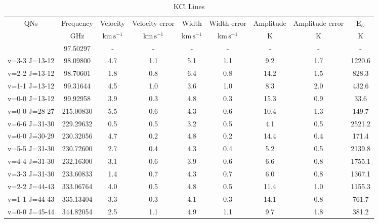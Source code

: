 \begin{table*}[htp]
\centering
\caption{KCl Lines}
\begin{tabular}{ccccccccc}
\label{tab:KCl_salt_lines}
QNs & Frequency & Velocity & Velocity error & Width & Width error & Amplitude & Amplitude error & E$_U$ \\
 & $\mathrm{GHz}$ & $\mathrm{km\,s^{-1}}$ & $\mathrm{km\,s^{-1}}$ & $\mathrm{km\,s^{-1}}$ & $\mathrm{km\,s^{-1}}$ & $\mathrm{K}$ & $\mathrm{K}$ & $\mathrm{K}$ \\
\hline
 & 97.50297 & - & - & - & - & - & - & - \\
v=3-3 J=13-12 & 98.09800 & 4.7 & 1.1 & 5.1 & 1.1 & 9.2 & 1.7 & 1220.6 \\
v=2-2 J=13-12 & 98.70601 & 1.8 & 0.8 & 6.4 & 0.8 & 14.2 & 1.5 & 828.3 \\
v=1-1 J=13-12 & 99.31644 & 4.5 & 1.0 & 3.6 & 1.0 & 8.3 & 2.0 & 432.6 \\
v=0-0 J=13-12 & 99.92958 & 3.9 & 0.3 & 4.8 & 0.3 & 15.3 & 0.9 & 33.6 \\
v=0-0 J=28-27 & 215.00830 & 5.5 & 0.6 & 4.3 & 0.6 & 10.4 & 1.3 & 149.7 \\
v=6-6 J=31-30 & 229.29632 & 0.5 & 0.5 & 3.2 & 0.5 & 4.1 & 0.5 & 2521.2 \\
v=0-0 J=30-29 & 230.32056 & 4.7 & 0.2 & 4.8 & 0.2 & 14.4 & 0.4 & 171.4 \\
v=5-5 J=31-30 & 230.72600 & 2.7 & 0.4 & 4.3 & 0.4 & 5.2 & 0.5 & 2139.8 \\
v=4-4 J=31-30 & 232.16300 & 3.1 & 0.6 & 3.9 & 0.6 & 6.6 & 0.8 & 1755.1 \\
v=3-3 J=31-30 & 233.60833 & 1.4 & 0.7 & 4.3 & 0.7 & 6.0 & 0.8 & 1367.1 \\
v=2-2 J=44-43 & 333.06764 & 4.0 & 0.5 & 4.8 & 0.5 & 11.4 & 1.0 & 1155.3 \\
v=1-1 J=44-43 & 335.13404 & 3.3 & 0.3 & 4.1 & 0.3 & 14.1 & 0.8 & 761.7 \\
v=0-0 J=45-44 & 344.82054 & 2.5 & 1.1 & 4.9 & 1.1 & 9.7 & 1.8 & 381.2 \\
\hline
\end{tabular}

\par 
\end{table*}
